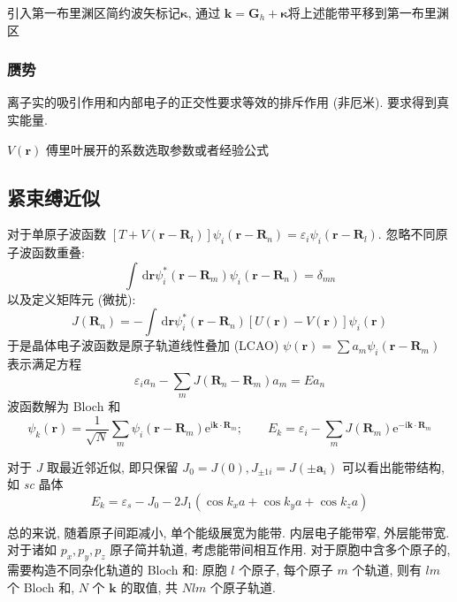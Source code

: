 \documentclass[11pt,a4paper]{article}%
\numberwithin{equation}{section}%
\renewcommand*{\vec}[1]{\bm{#1}}%
\newcommand{\dif}{\,\mathrm d}
\newcommand\mi{\mathrm{i}}
\newcommand\e{\mathrm{e}}%
\begin{document}
引入第一布里渊区简约波矢标记$\vec\kappa$, 通过 $\vec k = \vec G_h + \vec \kappa$将上述能带平移到第一布里渊区
\subsubsection{赝势} %
\label{subs:pseudo_potential}
离子实的吸引作用和内部电子的正交性要求等效的排斥作用 (非厄米). 要求得到真实能量. 

$V(\vec r)$ 傅里叶展开的系数选取参数或者经验公式
\subsection{紧束缚近似} %
\label{sub:LCAO}
对于单原子波函数 $[T + V(\vec r - \vec R_l)]\psi_i(\vec r - \vec R_n) = \varepsilon_i\psi_i(\vec r - \vec R_l)$. 忽略不同原子波函数重叠: 
\begin{equation}\label{equ:otho_bt_atom}
 	\int \dif\vec r\psi_i^*(\vec r - \vec R_m)\psi_i(\vec r -\vec R_n) = \delta_{mn}
\end{equation} 
以及定义矩阵元 (微扰):
\begin{equation}
	J(\vec R_n) = -\int\dif\vec r\psi_i^*(\vec r - \vec R_n)\left[U(\vec r) - V(\vec r)\right]\psi_i(\vec r)
\end{equation}
于是晶体电子波函数是原子轨道线性叠加 (LCAO) $\psi(\vec r) = \sum a_m\psi_i(\vec r - \vec R_m)$ 表示满足方程
\begin{equation}
	\varepsilon_i a_n - \sum_m J(\vec R_n - \vec R_m)a_m = Ea_n
\end{equation}
波函数解为 Bloch 和
\begin{equation}
	\psi_k(\vec r) = \frac 1{\sqrt{N}}\sum_m\psi_i(\vec r - \vec R_m)\e^{\mi\vec k\cdot\vec R_m};\qquad
	E_k = \varepsilon_i - \sum_m J(\vec R_m)\e^{-\mi\vec k\cdot\vec R_m}
\end{equation}

对于 $J$ 取最近邻近似, 即只保留 $J_0 = J(0), J_{\pm1i} = J(\pm\vec a_i)$ 可以看出能带结构, 如 \textit{sc} 晶体
\begin{equation}
	E_k = \varepsilon_s - J_0 - 2J_1(\cos k_x a + \cos k_y a + \cos k_z a)
\end{equation}

总的来说, 随着原子间距减小, 单个能级展宽为能带. 内层电子能带窄, 外层能带宽. 对于诸如 $p_x, p_y, p_z$ 原子简并轨道, 考虑能带间相互作用. 对于原胞中含多个原子的, 需要构造不同杂化轨道的 Bloch 和: 原胞 $l$ 个原子, 每个原子 $m$ 个轨道, 则有 $lm$ 个 Bloch 和, $N$ 个 $\vec k$ 的取值, 共 $Nlm$ 个原子轨道. 
\end{document}
